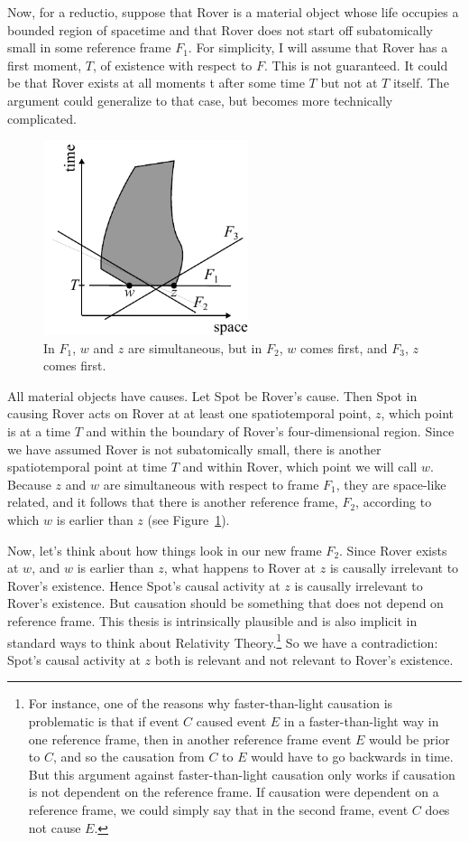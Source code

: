 Now, for a reductio, suppose that Rover is a material object whose life occupies a bounded region of 
spacetime and that Rover does not start off subatomically small in some reference frame $F_1$. For simplicity, 
I will assume that Rover has a first moment, $T$, of existence with respect to $F$. This is not guaranteed. 
It could be that Rover exists at all moments t after some time $T$ but not at $T$ itself. The argument could 
generalize to that case, but becomes more technically complicated.

\begin{figure}\label{fig:causal}
\includegraphics[width=6cm]{causal.pdf}
\caption{In $F_1$, $w$ and $z$ are simultaneous, but in $F_2$, $w$ comes first, and $F_3$, $z$ comes first.}
\end{figure}
All material objects have causes. Let Spot be Rover's cause. Then Spot in causing Rover acts on Rover at at 
least one spatiotemporal point, $z$, which point is at a time $T$ and within the boundary of Rover's four-dimensional
region. Since we have assumed Rover is not subatomically small, there is another spatiotemporal point at time $T$ 
and within Rover, which point we will call $w$. Because $z$ and $w$ are simultaneous with respect to frame $F_1$, 
they are space-like related, and it follows that there is another reference frame, $F_2$, according to which $w$ is 
earlier than $z$ (see Figure~\ref{fig:causal}).

Now, let's think about how things look in our new frame $F_2$. Since Rover exists at $w$, and $w$ is earlier than $z$, what 
happens to Rover at $z$ is causally irrelevant to Rover's existence. Hence Spot's causal activity at $z$ is causally 
irrelevant to Rover's existence. But causation should be something that does not depend on reference frame. This 
thesis is intrinsically plausible and is also implicit in standard ways to think about Relativity 
Theory.\footnote{For instance, one of the reasons why faster-than-light causation is problematic is 
that if event $C$ caused event $E$ in a faster-than-light way in one reference frame, then in another reference 
frame event $E$ would be prior to $C$, and so the causation from $C$ to $E$ would have to go backwards in 
time. But this argument against faster-than-light causation only works if causation is not dependent on the reference 
frame. If causation were dependent on a reference frame, we could simply say that in the second frame, event $C$ 
does not cause $E$.}  So we have a contradiction: Spot's causal activity at $z$ both is relevant and not relevant 
to Rover's existence.
 
